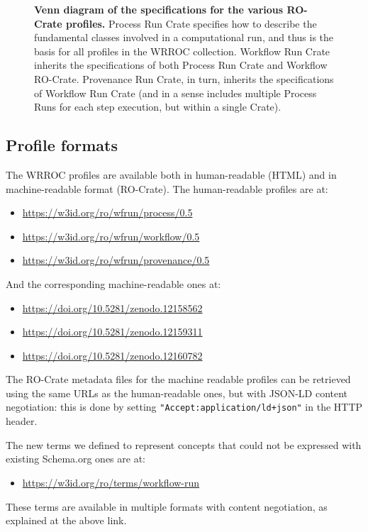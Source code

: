 \documentclass[10pt,letterpaper]{article}
\begin{document}
\begin{figure}[htb]
  \caption{{\bf Venn diagram of the specifications for the various RO-Crate profiles.}
  Process Run Crate specifies how to describe the fundamental classes involved in a computational run, and thus is the basis for all profiles in the WRROC collection.
  Workflow Run Crate inherits the specifications of both Process Run Crate and Workflow RO-Crate. Provenance Run Crate, in turn, inherits the specifications of Workflow Run Crate (and in a sense includes multiple Process Runs for each step execution, but within a single Crate).
  }
  \label{fig:profile_venn}
  \end{figure}


\subsection{Profile formats}\label{profile-formats}

The WRROC profiles are available both in human-readable (HTML) and in machine-readable format (RO-Crate). The human-readable profiles are at:
%
\begin{itemize}
    \item \url{https://w3id.org/ro/wfrun/process/0.5}
    \item \url{https://w3id.org/ro/wfrun/workflow/0.5}
    \item \url{https://w3id.org/ro/wfrun/provenance/0.5}
\end{itemize}
%
And the corresponding machine-readable ones at:
%
\begin{itemize}
    \item \url{https://doi.org/10.5281/zenodo.12158562}
    \item \url{https://doi.org/10.5281/zenodo.12159311}
    \item \url{https://doi.org/10.5281/zenodo.12160782}
\end{itemize}
%
The RO-Crate metadata files for the machine readable profiles can be retrieved using the same URLs as the human-readable ones, but with JSON-LD content negotiation: this is done by setting \texttt{"Accept:application/ld+json"} in the HTTP header.

The new terms we defined to represent concepts that could not be expressed with existing Schema.org ones are at:
%
\begin{itemize}
    \item \url{https://w3id.org/ro/terms/workflow-run}
\end{itemize}
%
These terms are available in multiple formats with content negotiation, as explained at the above link.
\end{document}
